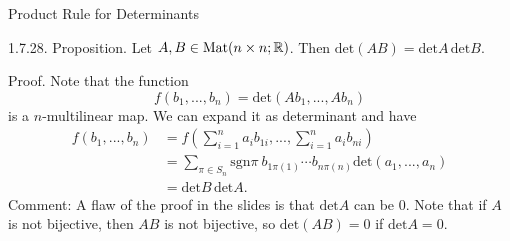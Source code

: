 \documentclass[hyperref={pdfpagelabels=true}]{beamer}
\newcommand{\Mat}{\text{Mat}}
\newcommand{\structb}[1]{\textcolor[rgb]{0.2,0.2,0.7}{#1}}
\newcommand{\<}{\langle}
\renewcommand{\>}{\rangle}
\newenvironment{shrinkeq}[1]%
{ \bgroup
  \addtolength\abovedisplayshortskip{#1}
  \addtolength\abovedisplayskip{#1}
  \addtolength\belowdisplayshortskip{#1}
  \addtolength\belowdisplayskip{#1}}
{\egroup\ignorespacesafterend}
\begin{document}
            \begin{frame}{Product Rule for Determinants}
                \begin{block}{1.7.28. Proposition.}
                    Let $A,B \in \Mat(n \times n;\R)$. Then $\text{det}(AB) = \text{det}A\,\text{det}B.$
                \end{block}
                \begin{block}{Proof.}
                    Note that the function
                    \begin{shrinkeq}{-0.3em}
                    \[f(b_{1},...,b_{n}) = \text{det}(Ab_{1},...,Ab_{n})\]
                    \end{shrinkeq}
                    is a $n$-multilinear map. We can expand it as determinant and have 
                    \begin{shrinkeq}{-0.3em}
                    \[
                        \begin{aligned}
                            f(b_{1},...,b_{n})
                            &=f(\sum_{i = 1}^{n}a_{i}b_{1i},...,\sum_{i = 1}^{n}a_{i}b_{ni})\\
                            &=
                            \sum_{\pi \in S_{n}} \text{sgn}\pi\ b_{1\pi(1)} \cdots b_{n\pi(n)} \text{det}(a_{1},...,a_{n})\\
                            &=\text{det}B\,\text{det}A.
                        \end{aligned}
                    \]
                    \end{shrinkeq}
                    \structb{Comment:}
                        A flaw of the proof in the slides is that $\text{det}A$ can be $0$. Note that if $A$ is not bijective, then $AB$ is not bijective, so $\text{det}(AB) = 0$ if $\text{det}A = 0$.
                    \end{block}
                \end{frame}
\end{document}
